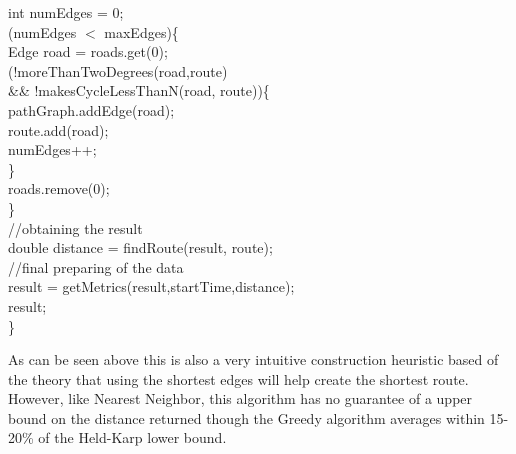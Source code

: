 \documentclass[midd]{thesis}
\newcommand{\tab}{\hspace*{2em}}
\begin{document}
\begin{codebox}
\tab int numEdges = 0;\\
\tab\While(numEdges $<$ maxEdges)\{\\
\tab\tab Edge road = roads.get(0);\\
\tab\tab \If(!moreThanTwoDegrees(road,route)\\
\tab\tab\tab \&\& !makesCycleLessThanN(road, route))\{\\
\tab\tab\tab pathGraph.addEdge(road);\\
\tab\tab\tab route.add(road);\\
\tab\tab\tab numEdges++;\\
\tab\tab\}\\\End
\tab\tab roads.remove(0);\\
\tab\}\\\End
\tab //obtaining the result\\
\tab double distance = findRoute(result, route);\\
\tab //final preparing of the data\\
\tab result = getMetrics(result,startTime,distance);\\
\tab \Return result;\\
\}
\end{codebox}
\tab As can be seen above this is also a very intuitive construction heuristic based of the theory that using the shortest edges will help create the shortest route. However, like Nearest Neighbor, this algorithm has no guarantee of a upper bound on the distance returned though the Greedy algorithm averages within 15-20\% of the Held-Karp lower bound\cite{htspc}.\\
\end{document}
